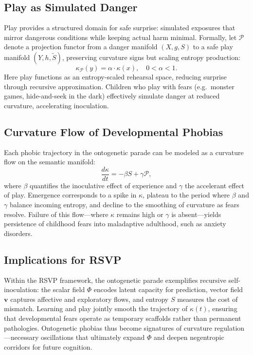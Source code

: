 \documentclass{article}
\theoremstyle{definition}
\begin{document}
\subsection{Play as Simulated Danger}

Play provides a structured domain for safe surprise: simulated exposures that
mirror dangerous conditions while keeping actual harm minimal. Formally, let
$\mathcal{P}$ denote a projection functor from a danger manifold
$(X, g, S)$ to a safe play manifold $(Y, h, \tilde S)$, preserving curvature
signs but scaling entropy production:
\[
\kappa_{\mathcal{P}}(y) = \alpha \cdot \kappa(x), \quad 0 < \alpha < 1.
\]
Here play functions as an entropy-scaled rehearsal space, reducing surprise
through recursive approximation. Children who play with fears (e.g.~monster
games, hide-and-seek in the dark) effectively simulate danger at reduced
curvature, accelerating inoculation.

\subsection{Curvature Flow of Developmental Phobias}

Each phobic trajectory in the ontogenetic parade can be modeled as a curvature
flow on the semantic manifold:
\[
\frac{d\kappa}{dt} = - \beta S + \gamma \mathcal{P},
\]
where $\beta$ quantifies the inoculative effect of experience and $\gamma$ the
accelerant effect of play. Emergence corresponds to a spike in $\kappa$, plateau
to the period where $\beta$ and $\gamma$ balance incoming entropy, and decline to
the smoothing of curvature as fears resolve. Failure of this flow---where
$\kappa$ remains high or $\gamma$ is absent---yields persistence of childhood
fears into maladaptive adulthood, such as anxiety disorders.

\subsection{Implications for RSVP}

Within the RSVP framework, the ontogenetic parade exemplifies recursive
self-inoculation: the scalar field $\Phi$ encodes latent capacity for prediction,
vector field $\mathbf{v}$ captures affective and exploratory flows, and entropy
$S$ measures the cost of mismatch. Learning and play jointly smooth the
trajectory of $\kappa(t)$, ensuring that developmental fears operate as
temporary scaffolds rather than permanent pathologies. Ontogenetic phobias thus
become signatures of curvature regulation---necessary oscillations that
ultimately expand $\Phi$ and deepen negentropic corridors for future cognition.
\end{document}
